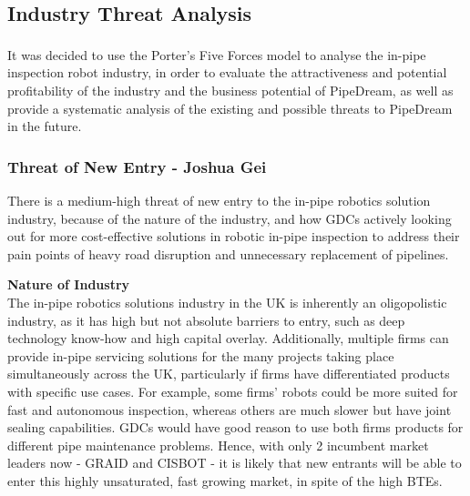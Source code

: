 \documentclass[11pt]{article}		%
\newcommand{\supercite}[1]{\textsuperscript{\cite{#1}}}		%
\begin{document}
		\subsection{Industry Threat Analysis} \label{industryP5F}
			
			It was decided to use the Porter's Five Forces model\supercite{porter2008five} to analyse the in-pipe inspection robot industry, in order to evaluate the attractiveness and potential profitability of the industry and the business potential of PipeDream, as well as provide a systematic analysis of the existing and possible threats to PipeDream in the future.

			\subsubsection{Threat of New Entry - Joshua Gei}
			
			There is a medium-high threat of new entry to the in-pipe robotics solution industry, because of the nature of the industry, and how GDCs actively looking out for more cost-effective solutions in robotic in-pipe inspection to address their pain points of heavy road disruption and unnecessary replacement of pipelines.
            
           \textbf{Nature of Industry} 
            \\The in-pipe robotics solutions industry in the UK is inherently an oligopolistic industry, as it has high but not absolute barriers to entry, such as deep technology know-how and high capital overlay. Additionally, multiple firms can provide in-pipe servicing solutions for the many projects taking place simultaneously across the UK, particularly if firms have differentiated products with specific use cases. For example, some firms’ robots could be more suited for fast and autonomous inspection, whereas others are much slower but have joint sealing capabilities. GDCs would have good reason to use both firms products for different pipe maintenance problems. Hence, with only 2 incumbent market leaders now - GRAID and CISBOT - it is likely that new entrants will be able to enter this highly unsaturated, fast growing market, in spite of the high BTEs.
         
\end{document}
